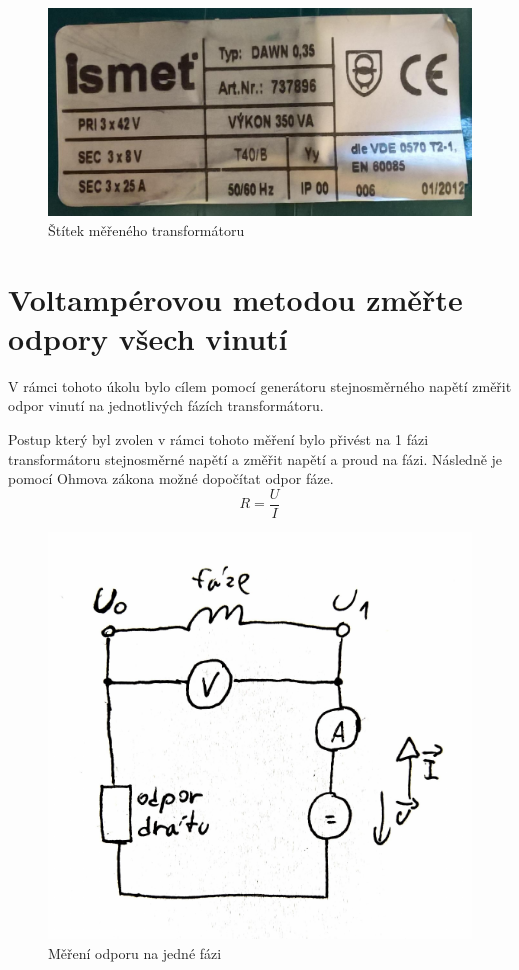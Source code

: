 \documentclass{protokol}
\begin{document}
\begin{figure}[H]
    \centering
    \includegraphics[width=0.8\linewidth]{TrafoStitek.png}
    \caption{Štítek měřeného transformátoru}
    \label{fig:TrafoStitek}
\end{figure}

\section{Voltampérovou metodou změřte odpory všech vinutí}
V rámci tohoto úkolu bylo cílem pomocí generátoru stejnosměrného napětí změřit odpor vinutí na jednotlivých fázích transformátoru. 

Postup který byl zvolen v rámci tohoto měření bylo přivést na 1 fázi transformátoru stejnosměrné napětí a změřit napětí a proud na fázi. Následně je pomocí Ohmova zákona možné dopočítat odpor fáze.
\begin{equation}
    R = \frac{U}{I}    
    \label{eq:OhmuvZakon}
\end{equation}

\begin{figure}[H]
    \centering
    \includegraphics[width=0.5\linewidth]{MereniOdporuNaJedneFazi.png}
    \caption{Měření odporu na jedné fázi}
    \label{fig:MereniOdporu}
\end{figure}
\end{document}
